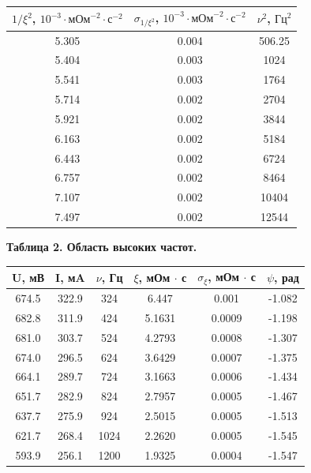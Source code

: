 \documentclass[15pt,a5paper,reqno]{article}
\begin{document}
    \begin{center}
        \begin{tabular}{|c|c|c|}
        \hline
        $1/\xi^2$, $10^{-3}\cdot\text{мОм}^{-2}\cdot\text{с}^{-2}$ & $\sigma_{1/\xi^2}$, $10^{-3}\cdot\text{мОм}^{-2}\cdot\text{с}^{-2}$ & $\nu^2$, $\text{Гц}^2$ \\ \hline\hline
        5.305 & 0.004 & 506.25 \\ \hline
        5.404 & 0.003 & 1024   \\ \hline
        5.541 & 0.003 & 1764   \\ \hline
        5.714 & 0.002 & 2704   \\ \hline
        5.921 & 0.002 & 3844   \\ \hline
        6.163 & 0.002 & 5184   \\ \hline
        6.443 & 0.002 & 6724   \\ \hline
        6.757 & 0.002 & 8464   \\ \hline
        7.107 & 0.002 & 10404  \\ \hline
        7.497 & 0.002 & 12544  \\ \hline
        \end{tabular}
    \end{center}

    \newpage
    \noindent\hypertarget{table_2}{\textbf{Таблица 2. Область высоких частот.}}
    \begin{center}
        \begin{tabular}{|c|c|c|c|c|c|}
        \hline
        U, мВ & I, мA & $\nu$, Гц & $\xi$, мОм $\cdot$ с & $\sigma_{\xi}$, мОм $\cdot$ с & $\psi$, рад\\ \hline\hline
        674.5 & 322.9 & 324       & 6.447                & 0.001    & -1.082 \\ \hline
        682.8 & 311.9 & 424       & 5.1631               & 0.0009   & -1.198 \\ \hline
        681.0 & 303.7 & 524       & 4.2793               & 0.0008   & -1.307 \\ \hline
        674.0 & 296.5 & 624       & 3.6429               & 0.0007   & -1.375 \\ \hline
        664.1 & 289.7 & 724       & 3.1663               & 0.0006   & -1.434 \\ \hline
        651.7 & 282.9 & 824       & 2.7957               & 0.0005   & -1.467 \\ \hline
        637.7 & 275.9 & 924       & 2.5015               & 0.0005   & -1.513 \\ \hline
        621.7 & 268.4 & 1024      & 2.2620               & 0.0005   & -1.545 \\ \hline
        593.9 & 256.1 & 1200      & 1.9325               & 0.0004   & -1.547 \\ \hline
        \end{tabular}
    \end{center}
\end{document}
